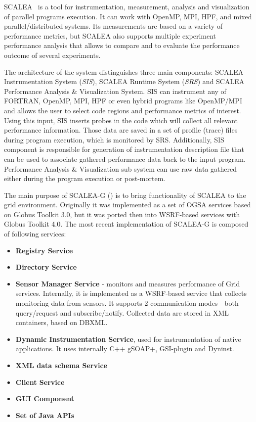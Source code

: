 SCALEA~\cite{SCALEA1} is a tool for instrumentation, measurement, analysis and visualization of parallel programs execution. It can work with OpenMP, MPI, HPF, and mixed parallel/distributed systems. Its measurements are based on a variety of performance metrics, but SCALEA also supports multiple experiment performance analysis that allows to compare and to evaluate the performance outcome of several experiments.

The architecture of the system distinguishes three main components: SCALEA Instrumentation System (\emph{SIS}), SCALEA Runtime System (\emph{SRS}) and SCALEA Performance Analysis \& Visualization System. SIS can instrument any of FORTRAN, OpenMP, MPI, HPF or even hybrid programs like OpenMP/MPI and allows the user to select code regions and performance metrics of interest. Using this input, SIS inserts probes in the code which will collect all relevant performance information. Those data are saved in a set of profile (trace) files during program execution, which is monitored by SRS. Additionally, SIS component is responsible for generation of instrumentation description file that can be used to associate gathered performance data back to the input program. Performance Analysis \& Visualization sub system can use raw data gathered either during the program execution or post-mortem.

The main purpose of SCALEA-G (\cite{SCALEA2, SCALEA3}) is to bring functionality of SCALEA to the grid environment. Originally it was implemented as a set of OGSA services based on Globus Toolkit 3.0, but it was ported then into WSRF-based services with Globus Toolkit 4.0. The most recent implementation of SCALEA-G is composed of following services:

\begin{itemize}

\item{ {\bf Registry Service}}

\item{ {\bf Directory Service}}

\item{ {\bf Sensor Manager Service} - monitors and measures performance of Grid services. Internally, it is implemented as a WSRF-based service that collects monitoring data from sensors. It supports 2 communication modes - both query/request and subscribe/notify. Collected data are stored in XML containers, based on DBXML.}

\item{ {\bf Dynamic Instrumentation Service}, used for instrumentation of native applications. It uses internally C++ gSOAP+, GSI-plugin and Dyninst.}

\item{ {\bf XML data schema Service}}

\item{ {\bf Client Service}}

\item{ {\bf GUI Component}}

\item{ {\bf Set of Java APIs}}

\end{itemize}

